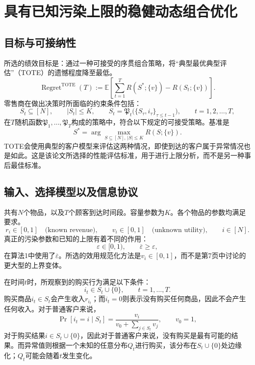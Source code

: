 \documentclass{article}
\begin{document}
\section*{具有已知污染上限的稳健动态组合优化}

\subsection*{目标与可接纳性}
所选的绩效目标是：通过一种可接受的序贯组合策略，将“典型最优典型评估”（TOTE）的遗憾程度降至最低。
\begin{equation}
\operatorname{Regret}^{\mathrm{TOTE}}(T)
:=\mathbb{E}\left[\sum_{t=1}^{T} R(S^*;\{v\})-R(S_t;\{v\})\right].
\tag{2}
\end{equation}
零售商在做出决策时所面临的约束条件包括：
\[
S_t\subseteq[N],\qquad |S_t|\le K,\qquad
S_t=\mathfrak{P}_t\bigl(\{S_\tau,i_\tau\}_{\tau\le t-1}\bigr),
\qquad t=1,2,\ldots,T,
\]
在$T$随机函数$\mathfrak{P}_1,\ldots,\mathfrak{P}_T$构成的策略中，符合以下规定的可接受策略。基准是
\[
S^*=\arg\max_{S\subseteq[N],\,|S|\le K}R(S;\{v\}).
\]
TOTE会使用典型的客户模型来评估这两种情况，即使到达的客户属于异常情况也是如此。这是该论文所选择的性能评估标准，用于进行上限分析，而不是另一种事后最佳标准。

\subsection*{输入、选择模型以及信息协议}
共有$N$个物品，以及$T$个顾客到达时间段。容量参数为$K$。各个物品的参数均满足要求。
\[
r_i\in[0,1]\quad\text{(known revenue)},\qquad
v_i\in[0,1]\quad\text{(unknown utility)},\qquad i\in[N].
\]
真正的污染参数和已知的上限有着不同的作用：
\[
\varepsilon\in[0,1),\qquad \overline{\varepsilon}\ge\varepsilon,
\]
在算法1中使用了$\overline{\varepsilon}$。所选的效用规范化方法是$v_i\in[0,1]$，而不是第7页中讨论的更大型的上界变体。

在时间$t$时，所观察到的购买行为满足以下条件：
\[
i_t\in S_t\cup\{0\},\qquad t=1,\ldots,T.
\]
购买商品$i_t\in S_t$会产生收入$r_{i_t}$；而$i_t=0$则表示没有购买任何商品，因此不会产生任何收入。对于普通客户来说，
\begin{equation}
\Pr[i_t=i\mid S_t]
=\frac{v_i}{v_0+\sum_{j\in S_t}v_j},\qquad v_0=1,
\tag{1}
\end{equation}
对于购买结果$i\in S_t\cup\{0\}$，因此对于普通客户来说，没有购买是最有可能的结果。而异常值则根据一个未知的任意分布$Q_t$进行购买，该分布在$S_t\cup\{0\}$处边缘化；$Q_t$可能会随着$t$发生变化。
\end{document}
